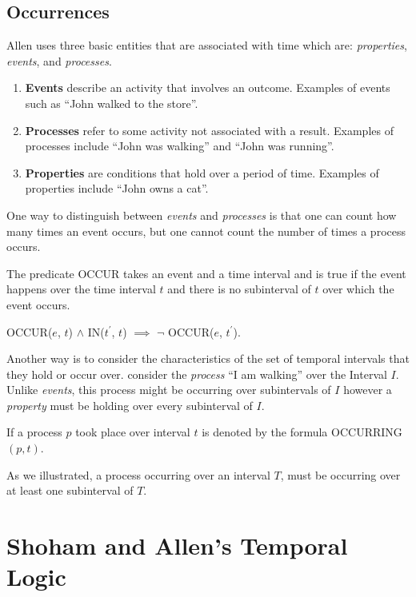 \subsection{Occurrences}
Allen uses three basic entities that are associated with time which are: \textit{properties}, \textit{events}, and \textit{processes}.
\begin{enumerate}
  \item \textbf{Events} describe an activity that involves an outcome. Examples of events such as ``John walked to the store''.

  \item \textbf{Processes} refer to some activity not associated with a result. Examples of processes include ``John was walking'' and ``John was running''.

  \item \textbf{Properties} are conditions that hold over a period of time. Examples of properties include ``John owns a cat''.
\end{enumerate}
One way to distinguish between \textit{events} and \textit{processes} is that one can count how many times an event occurs, but one cannot count 
the number of times a process occurs.


The predicate OCCUR takes an event and a time interval and is true if the event happens over the time interval $t$ and there is no subinterval of $t$
over which the event occurs.

\begin{center}
  OCCUR($e$, $t$) $\land$ IN($t^\prime$, $t$) $\implies$ \(\lnot\) OCCUR($e$, $t^\prime$).
\end{center}

Another way is to consider the characteristics of the set of temporal intervals that they hold or occur over. 
consider the \textit{process} ``I am walking'' over the Interval $I$. Unlike \textit{events}, this process might be occurring over subintervals of $I$ however a \textit{property} must be holding over every subinterval of $I$.


If a process $p$ took place over interval $t$ is denoted by the formula OCCURRING$(p,t)$.


As we illustrated, a process occurring over an interval $T$, must be occurring over at least one subinterval of $T$.

\section{Shoham and Allen's Temporal Logic}

